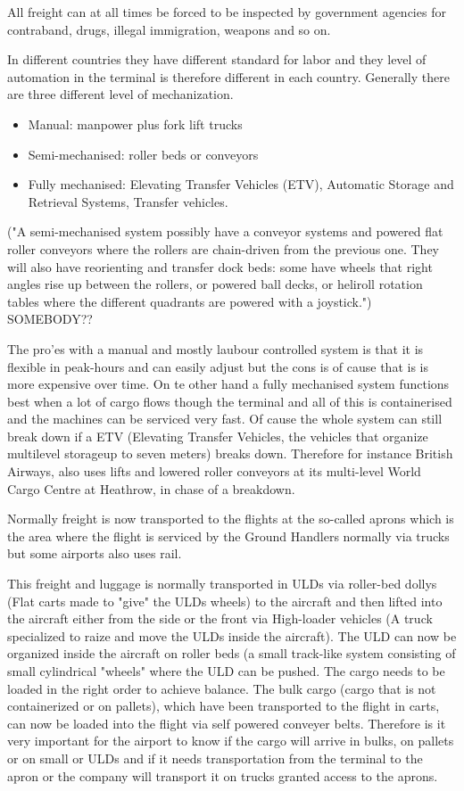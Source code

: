 All freight can at all times be forced to be inspected by government agencies for contraband, drugs, illegal immigration, weapons and so on.

In different countries they have different standard for labor and they level of automation in the terminal is therefore different in each country. Generally there are three different level of mechanization.
\begin{itemize}
\item Manual: manpower plus fork lift trucks
\item Semi-mechanised: roller beds or conveyors
\item Fully mechanised: Elevating Transfer Vehicles (ETV), Automatic Storage and Retrieval Systems, Transfer vehicles.
\end{itemize}

("A semi-mechanised system possibly have a conveyor systems and powered flat roller conveyors where the rollers are chain-driven from the previous one. They will also have reorienting and transfer dock beds: some have wheels that right angles rise up between the rollers, or powered ball decks, or heliroll rotation tables where the different quadrants are powered with a joystick.") SOMEBODY??

The pro'es with a manual and mostly laubour controlled system is that it is flexible in peak-hours and can easily adjust but the cons is of cause that is is more expensive over time.
On te other hand a fully mechanised system functions best when a lot of cargo flows though the terminal and all of this is containerised and the machines can be serviced very fast. Of cause the whole system can still break down if a ETV (Elevating Transfer Vehicles, the vehicles that organize multilevel storageup to seven meters) breaks down.  Therefore for instance British Airways, also uses lifts and lowered roller conveyors at its multi-level World Cargo Centre at Heathrow, in chase of a breakdown.

Normally freight is now transported to the flights at the so-called aprons which is the area where the flight is serviced by the Ground Handlers normally via trucks but some airports also uses rail.

This freight and luggage is normally transported in ULDs via roller-bed dollys (Flat carts made to "give" the ULDs wheels) to the aircraft and then lifted into the aircraft either from the side or the front via High-loader vehicles (A truck specialized to raize and move the ULDs inside the aircraft).
The ULD can now be organized inside the aircraft on roller beds (a small track-like system consisting of small cylindrical "wheels" where the ULD can be pushed. The cargo needs to be loaded in the right order to achieve balance. The bulk cargo (cargo that is not containerized or on pallets), which have been transported to the flight in carts, can now be loaded into the flight via self powered conveyer belts. Therefore is it very important for the airport to know if the cargo will arrive in bulks, on pallets or on small or ULDs and if it needs transportation from the terminal to the apron or the company will transport it on trucks granted access to the aprons.

